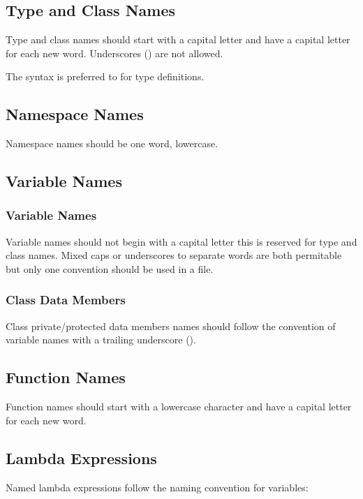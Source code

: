 \subsection{Type and Class Names}

Type and class names should start with a capital letter and have a capital letter for each new word.
Underscores (\inlinecode{_}) are not allowed.

The  syntax is preferred to  for type definitions.

\subsection{Namespace Names}

Namespace names should be one word, lowercase.

\subsection{Variable Names}

\subsubsection{Variable Names}

Variable names should not begin with a capital letter this is reserved for type and class names. Mixed caps or underscores to separate words are both permitable but only one convention should be used in a file.

\subsubsection{Class Data Members}

Class private/protected data members names should follow the convention of variable names with a trailing underscore (\inlinecode{_}).

\subsection{Function Names}

Function names should start with a lowercase character and have a capital letter for each new word.

\subsection{Lambda Expressions}

Named lambda expressions follow the naming convention for variables:

